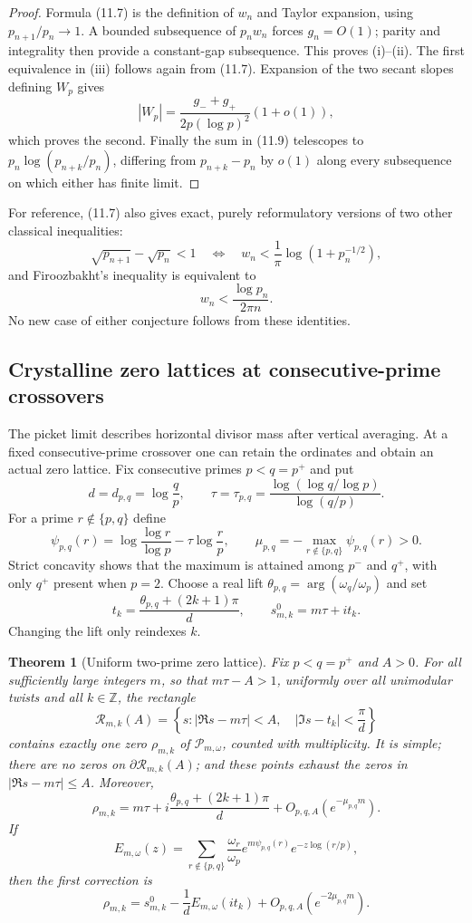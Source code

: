 \documentclass[11pt]{article}
\newtheorem{theorem}{Theorem}[section]
\theoremstyle{definition}
\theoremstyle{remark}
\newcommand{\cP}{\mathcal P}
\begin{document}
\begin{proof}
Formula (11.7) is the definition of $w_n$ and Taylor expansion, using
$p_{n+1}/p_n\to1$.  A bounded subsequence of $p_nw_n$ forces $g_n=O(1)$;
parity and integrality then provide a constant-gap subsequence.  This proves
(i)--(ii).  The first equivalence in (iii) follows again from (11.7).  Expansion
of the two secant slopes defining $W_p$ gives
\[
 |W_p|=\frac{g_-+g_+}{2p(\log p)^2}(1+o(1)),
\tag{11.10}
\]
which proves the second.  Finally the sum in (11.9) telescopes to
$p_n\log(p_{n+k}/p_n)$, differing from $p_{n+k}-p_n$ by $o(1)$ along every
subsequence on which either has finite limit.
\end{proof}

For reference, (11.7) also gives exact, purely reformulatory versions of two
other classical inequalities:
\[
 \sqrt{p_{n+1}}-\sqrt{p_n}<1
 \quad\Longleftrightarrow\quad
 w_n<\frac1\pi\log(1+p_n^{-1/2}),
\tag{11.11}
\]
and Firoozbakht's inequality is equivalent to
\[
 w_n<\frac{\log p_n}{2\pi n}.
\tag{11.12}
\]
No new case of either conjecture follows from these identities.

\subsection{Crystalline zero lattices at consecutive-prime crossovers}
\label{subsec:crystalline-lattices}

The picket limit describes horizontal divisor mass after vertical averaging.  At a
fixed consecutive-prime crossover one can retain the ordinates and obtain an actual
zero lattice.  Fix consecutive primes $p<q=p^+$ and put
\[
 d=d_{p,q}=\log\frac qp,\qquad
 \tau=\tau_{p,q}=\frac{\log(\log q/\log p)}{\log(q/p)}.
\tag{11.13}
\]
For a prime $r\notin\{p,q\}$ define
\[
 \psi_{p,q}(r)=\log\frac{\log r}{\log p}-\tau\log\frac rp,
 \qquad
 \mu_{p,q}=-\max_{r\notin\{p,q\}}\psi_{p,q}(r)>0.
\tag{11.14}
\]
Strict concavity shows that the maximum is attained among $p^-$ and $q^+$,
with only $q^+$ present when $p=2$.  Choose a real lift
$\theta_{p,q}=\arg(\omega_q/\omega_p)$ and set
\[
 t_k=\frac{\theta_{p,q}+(2k+1)\pi}{d},\qquad
 s^0_{m,k}=m\tau+it_k.
\tag{11.15}
\]
Changing the lift only reindexes $k$.

\begin{theorem}[Uniform two-prime zero lattice]
\label{thm:two-prime-lattice}
Fix $p<q=p^+$ and $A>0$.  For all sufficiently large integers $m$, so that
$m\tau-A>1$, uniformly over all unimodular twists and all $k\in\mathbb Z$,
the rectangle
\[
 \mathscr R_{m,k}(A)=\left\{s:
 |\Re s-m\tau|<A,\quad |\Im s-t_k|<\frac\pi d\right\}
\tag{11.16}
\]
contains exactly one zero $\rho_{m,k}$ of $\cP_{m,\omega}$, counted with
multiplicity.  It is simple; there are no zeros on $\partial\mathscr R_{m,k}(A)$;
and these points exhaust
the zeros in $|\Re s-m\tau|\le A$.  Moreover,
\[
 \boxed{
 \rho_{m,k}=m\tau+i\frac{\theta_{p,q}+(2k+1)\pi}{d}
 +O_{p,q,A}(e^{-\mu_{p,q}m}).}
\tag{11.17}
\]
If
\[
 E_{m,\omega}(z)=
 \sum_{r\notin\{p,q\}}\frac{\omega_r}{\omega_p}
 e^{m\psi_{p,q}(r)}e^{-z\log(r/p)},
\tag{11.18}
\]
then the first correction is
\[
 \boxed{
 \rho_{m,k}=s^0_{m,k}-\frac1dE_{m,\omega}(it_k)
 +O_{p,q,A}(e^{-2\mu_{p,q}m}).}
\tag{11.19}
\]
\end{theorem}
\end{document}
